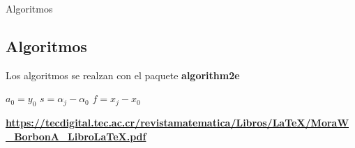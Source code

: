 \begin{frame}{Algoritmos}
\subsection{Algoritmos}

Los algoritmos se realzan con el paquete \textbf{algorithm2e}

\begin{algorithm}[H]
$a_0=y_0$\;
$s=\alpha_j-\alpha_0$\;
$f=x_j-x_0$\;
\end{algorithm}

\textbf{{\footnotesize \url{https://tecdigital.tec.ac.cr/revistamatematica/Libros/LaTeX/MoraW_BorbonA_LibroLaTeX.pdf}}}

\end{frame}